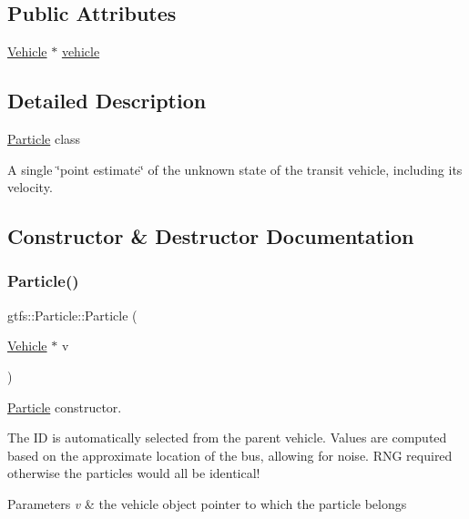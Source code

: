 \subsection*{Public Attributes}
\begin{DoxyCompactItemize}
\item 
\hyperlink{classgtfs_1_1Vehicle}{Vehicle} $\ast$ \hyperlink{classgtfs_1_1Particle_a81c313d505ecb592d79463f167dfb76c}{vehicle}
\end{DoxyCompactItemize}


\subsection{Detailed Description}
\hyperlink{classgtfs_1_1Particle}{Particle} class

A single \char`\"{}point estimate\char`\"{} of the unknown state of the transit vehicle, including its velocity. 

\subsection{Constructor \& Destructor Documentation}
\mbox{\label{classgtfs_1_1Particle_ad7f42e77c6c7f3042c977fd5a42ff82f}} 
\subsubsection{\texorpdfstring{Particle()}{Particle()}\hspace{0.1cm}{\footnotesize\ttfamily [1/2]}}
{\footnotesize\ttfamily gtfs\+::\+Particle\+::\+Particle (\begin{DoxyParamCaption}\item[{\hyperlink{classgtfs_1_1Vehicle}{Vehicle} $\ast$}]{v }\end{DoxyParamCaption})}

\hyperlink{classgtfs_1_1Particle}{Particle} constructor.

The ID is automatically selected from the parent vehicle. Values are computed based on the approximate location of the bus, allowing for noise. R\+NG required otherwise the particles would all be identical!


\begin{DoxyParams}{Parameters}
{\em v} & the vehicle object pointer to which the particle belongs \\
\hline
\end{DoxyParams}
\mbox{\label{classgtfs_1_1Particle_ac386e64b43b1e317063f9a6666d604ce}} 

